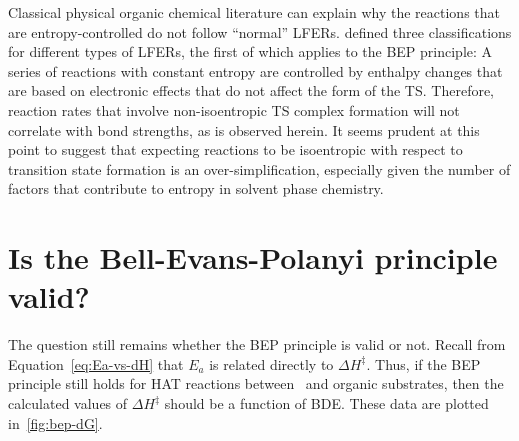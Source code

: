 \begin{doublespace}
Classical physical organic chemical literature can explain why the reactions
that are entropy-controlled do not follow ``normal'' LFERs.\cite{Exner1973}
\citet{Blackadder1958} defined three classifications for different types of
LFERs, the first of which applies to the BEP principle: A series of reactions
with constant entropy are controlled by enthalpy changes that are based on
electronic effects that do not affect the form of the TS. Therefore, reaction
rates that involve non-isoentropic TS complex formation will not correlate with
bond strengths, as is observed herein. It seems prudent at this point to
suggest that expecting reactions to be isoentropic with respect to transition
state formation is an over-simplification, especially given the number of
factors that contribute to entropy in solvent phase chemistry.

\section{Is the Bell-Evans-Polanyi principle valid?}

The question still remains whether the BEP principle is valid or not. Recall
from Equation~\ref{eq:Ea-vs-dH} that $E_a$ is related directly to $\Delta
H^\ddagger$. Thus, if the BEP principle still holds for HAT reactions between
\cumo\ and organic substrates, then the calculated values of $\Delta
H^\ddagger$ should be a function of  BDE. These data are plotted
in~\ref{fig:bep-dG}.


\end{doublespace}

